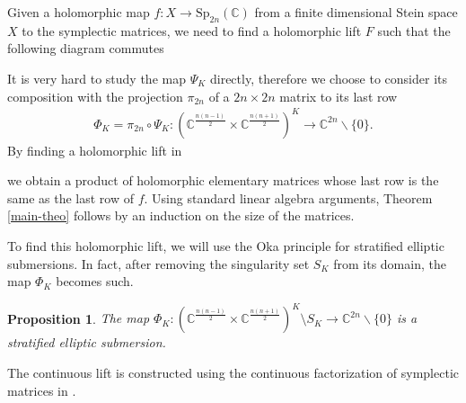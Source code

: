 \documentclass[10pt]{amsart}
\newtheorem{prop}[theo]{Proposition}
\theoremstyle{remark}
\begin{document}
Given a holomorphic map $f: X \to \mathrm{Sp}_{2n}(\mathbb{C})$ from a finite dimensional Stein space $X$ to the symplectic matrices, we need to find a holomorphic lift $F$ such that the following diagram commutes 
\begin{center}
\end{center}
It is very hard to study the map $\Psi_K$ directly, therefore we choose to consider its composition with the projection $\pi_{2n}$ of a $2n \times 2n$ matrix to its last row
\begin{align}   \label{def-PhiK}
    \Phi_K = \pi_{2n} \circ \Psi_K : (\mathbb{C}^{\frac{n(n-1)}{2}} \times \mathbb{C}^{\frac{n(n+1)}{2}} )^K \to \mathbb{C}^{2n}\backslash \lbrace 0 \rbrace.  
\end{align}
By finding a holomorphic lift in 
\begin{center}
\end{center}
we obtain a product of holomorphic elementary matrices whose last row is the same as the last row of $f$. Using standard linear algebra arguments, Theorem \ref{main-theo} follows by an induction on the size of the matrices. 

To find this holomorphic lift, we will use the Oka principle for stratified elliptic submersions. In fact, after removing the singularity set $S_K$ from its domain, the map $\Phi_K$ becomes such. 
\begin{prop} \label{prop: Phi-K}
The map $\Phi_K: (\mathbb{C}^{\frac{n(n-1)}{2}} \times \mathbb{C}^{\frac{n(n+1)}{2}})^K \setminus S_K \to \mathbb{C}^{2n}\backslash \lbrace 0 \rbrace$ is a stratified elliptic submersion.    
\end{prop}
The continuous lift is constructed using the continuous factorization of symplectic matrices in \cite{IKL}.
\end{document}
